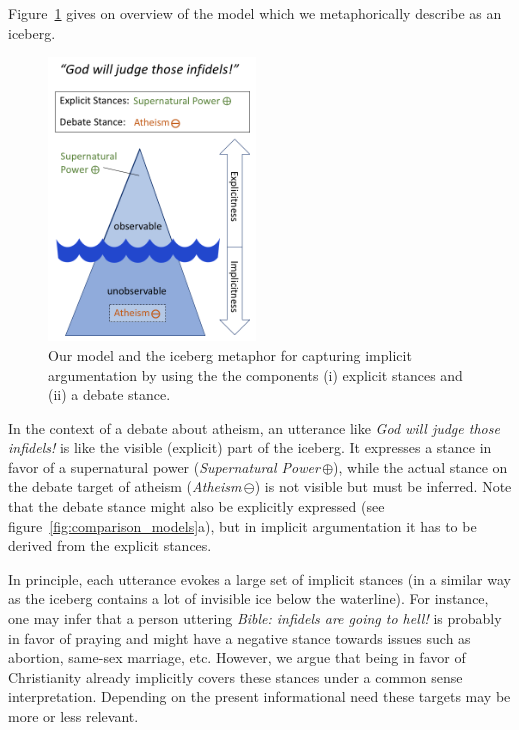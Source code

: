 \documentclass[11pt]{article}
\begin{document}
Figure~\ref{fig:icebergModel} gives on overview of the model which we metaphorically describe as an iceberg.

\begin{figure}
  \includegraphics[width=0.49\textwidth]{figures/IceBergModel_single.png}
  \caption{Our model and the iceberg metaphor for capturing implicit argumentation by using the the components (i) explicit stances and (ii) a debate stance.}
  \label{fig:icebergModel}
\end{figure}

In the context of a debate about atheism, an utterance like \textit{God will judge those infidels!} is like the visible (explicit) part of the iceberg.
It expresses a stance in favor of a supernatural power (\textit{Supernatural Power}\,$\oplus$), while the actual stance on the debate target of atheism (\textit{Atheism}\,$\ominus$) is not visible but must be inferred.
Note that the debate stance might also be explicitly expressed (see figure~\ref{fig:comparison_models}a), but in implicit argumentation it has to be derived from the explicit stances.

In principle, each utterance evokes a large set of implicit stances (in a similar way as the iceberg contains a lot of invisible ice below the waterline). 
For instance, one may infer that a person uttering \textit{Bible: infidels are going to hell!} is probably in favor of praying and might have a negative stance towards issues such as abortion, same-sex marriage, etc. 
However, we argue that being in favor of Christianity already implicitly covers these stances under a common sense interpretation. 
Depending on the present informational need these targets may be more or less relevant.
\end{document}
